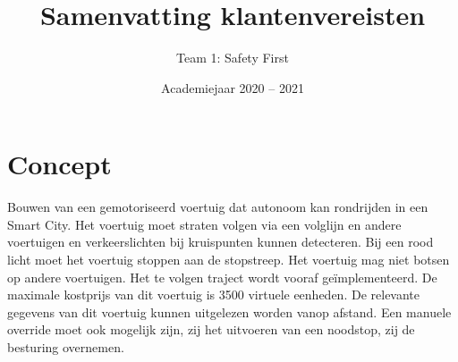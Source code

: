 \documentclass[a4paper,kulak]{kulakarticle} %
\date{Academiejaar 2020 -- 2021}
\title{Samenvatting klantenvereisten}
\author{Team 1: Safety First}
\begin{document}
\maketitle

\section{Concept}

Bouwen van een gemotoriseerd voertuig dat autonoom kan rondrijden in een Smart City. Het voertuig moet straten volgen via een volglijn en andere voertuigen en verkeerslichten bij kruispunten kunnen detecteren. Bij een rood licht moet het voertuig stoppen aan de stopstreep. Het voertuig mag niet botsen op andere voertuigen. Het te volgen traject wordt vooraf geïmplementeerd. De maximale kostprijs van dit voertuig is 3500 virtuele eenheden. De relevante gegevens van dit voertuig kunnen uitgelezen worden vanop afstand. Een manuele override moet ook mogelijk zijn, zij het uitvoeren van een noodstop, zij de besturing overnemen.
\end{document}
